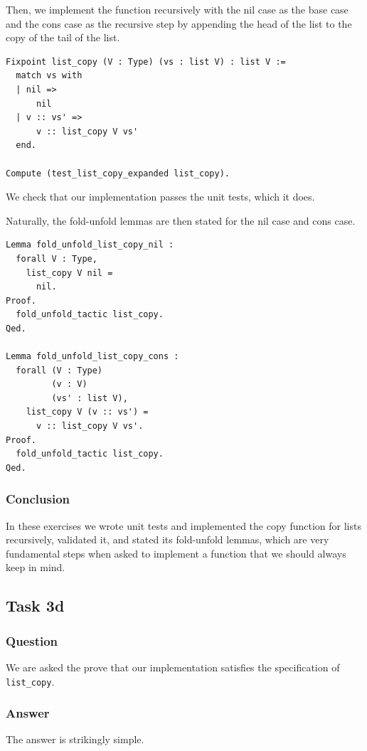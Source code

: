 \documentclass{article}
\begin{document}
Then, we implement the function recursively with the nil case as the base case and the cons case as the recursive step by appending the head of the list to the copy of the tail of the list.

\begin{lstlisting}
Fixpoint list_copy (V : Type) (vs : list V) : list V :=
  match vs with
  | nil =>
      nil
  | v :: vs' =>
      v :: list_copy V vs'
  end.

Compute (test_list_copy_expanded list_copy).
\end{lstlisting}

We check that our implementation passes the unit tests, which it does.

Naturally, the fold-unfold lemmas are then stated for the nil case and cons case.

\begin{lstlisting}
Lemma fold_unfold_list_copy_nil :
  forall V : Type,
    list_copy V nil =
      nil.
Proof.
  fold_unfold_tactic list_copy.
Qed.

Lemma fold_unfold_list_copy_cons :
  forall (V : Type)
         (v : V)
         (vs' : list V),
    list_copy V (v :: vs') =
      v :: list_copy V vs'.
Proof.
  fold_unfold_tactic list_copy.
Qed.
\end{lstlisting}

\subsubsection{Conclusion}
In these exercises we wrote unit tests and implemented the copy function for lists recursively, validated it, and stated its fold-unfold lemmas, which are very fundamental steps when asked to implement a function that we should always keep in mind.

\subsection{Task 3d}
\subsubsection{Question}
We are asked the prove that our implementation satisfies the specification of \texttt{list\_copy}.

\subsubsection{Answer}
The answer is strikingly simple. 
\end{document}
